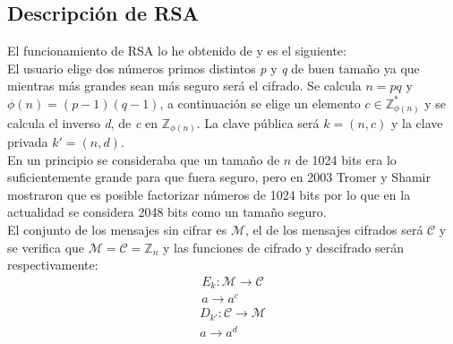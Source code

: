 \subsection{Descripción de RSA}
El funcionamiento de RSA lo he obtenido de \cite{angelRiosMateos} y es el siguiente:\\
El usuario elige dos números primos distintos \emph{p} y \emph{q} de buen tamaño ya que mientras más grandes sean más seguro será el cifrado.
Se calcula $n = pq$ y $\phi(n) = (p-1)(q-1)$, a continuación se elige un elemento $c \in \mathbb{Z}_{\phi(n)}^*$ y se calcula el inverso \emph{d}, de \emph{c} en $\mathbb{Z}_{\phi(n)}$. La clave pública será $k=(n,c)$ y la clave privada $k'=(n,d)$.\\
En un principio se consideraba que un tamaño de $n$ de 1024 bits era lo suficientemente grande para que fuera seguro, pero en 2003 Tromer y Shamir mostraron que es posible factorizar números de 1024 bits \cite{1024RSA} por lo que en la actualidad se considera 2048 bits como un tamaño seguro.\\
El conjunto de los mensajes sin cifrar es $\mathcal{M}$, el de los mensajes cifrados será $\mathcal{C}$ y se verifica que $\mathcal{M} = \mathcal{C} = \mathbb{Z}_n$ y las funciones de cifrado y descifrado serán respectivamente:
\begin{align*}
	E_{k}:\mathcal{M}\rightarrow\mathcal{C}\\
	a \rightarrow a^c
\end{align*}
\begin{align*}
	D_{k'}:\mathcal{C}\rightarrow\mathcal{M}\\
	a \rightarrow a^d
\end{align*}

